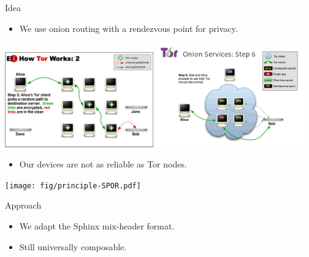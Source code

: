 \begin{frame}
  \begin{block}{Idea}
    \begin{itemize}
      \item We use onion routing with a rendezvous point for privacy.
    \end{itemize}
  \end{block}

  \includegraphics[width=0.48\textwidth]{fig/tor.png}
  \hfill
  \includegraphics[width=0.48\textwidth]{fig/tor-hs.png}

  \pause

  \begin{remark}
    \begin{itemize}
      \item Our devices are not as reliable as Tor nodes.
    \end{itemize}
  \end{remark}
\end{frame}

\begin{frame}
  \begin{center}
    \texttt{[image: fig/principle-SPOR.pdf]}
  \end{center}

  \pause

  \begin{block}{Approach}
    \begin{itemize}
      \item We adapt the Sphinx mix-header format.
      \item Still universally composable.
    \end{itemize}
  \end{block}
\end{frame}

